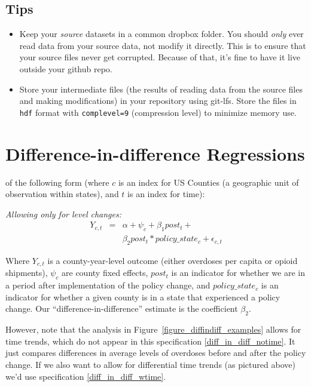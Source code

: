 \documentclass[12pt]{article}
\begin{document}
\subsection*{Tips}
\begin{itemize}
  \item Keep your \emph{source} datasets in a common dropbox folder. You should \emph{only} ever read data from your source data, not modify it directly. This is to ensure that your source files never get corrupted. Because of that, it's fine to have it live outside your github repo.
  \item Store your intermediate files (the results of reading data from the source files and making modifications) in your repository using git-lfs. Store the files in \texttt{hdf} format with \texttt{complevel=9} (compression level) to minimize memory use.
\end{itemize}

\appendix

\section{Difference-in-difference Regressions}\label{appendix_diffindiff}

of the following form (where $c$ is an index for US Counties (a geographic unit of observation within states), and $t$ is an index for time):

\emph{Allowing only for level changes:}
\begin{eqnarray}
 Y_{c,t} &=& \alpha + \psi_{c} + \beta_1 post_{t} + \label{diff_in_diff_notime}\\
  && \beta_2 post_{t} * policy\_state_{c} + \epsilon_{c,t} \nonumber
\end{eqnarray}

Where $Y_{c,t}$ is a county-year-level outcome (either overdoses per capita or opioid shipments),  $\psi_c$ are county fixed effects, $post_{t}$ is an indicator for whether we are in a period after implementation of the policy change, and $policy\_state_{c}$ is an indicator for whether a given county is in a state that experienced a policy change. Our ``difference-in-difference'' estimate is the coefficient $\beta_2$.

However, note that the analysis in Figure~\ref{figure_diffindiff_examples} allows for time trends, which do not appear in this specification \ref{diff_in_diff_notime}. It just compares differences in average levels of overdoses before and after the policy change. If we also want to allow for differential time trends (as pictured above) we'd use specification \ref{diff_in_diff_wtime}.
\end{document}
